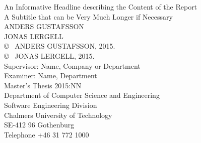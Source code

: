 \newpage
\thispagestyle{plain}
\vspace*{4.5cm}
An Informative Headline describing the Content of the Report\\
A Subtitle that can be Very Much Longer if Necessary\\
ANDERS GUSTAFSSON\\
JONAS LERGELL\\[0.5cm]

\copyright ~ ANDERS GUSTAFSSON, 2015.\\
\copyright ~ JONAS LERGELL, 2015.\\[0.5cm]

Supervisor: Name, Company or Department\\
Examiner: Name, Department\\[0.5cm]

Master's Thesis 2015:NN\\
Department of Computer Science and Engineering\\
Software Engineering Division\\
Chalmers University of Technology\\
SE-412 96 Gothenburg\\
Telephone +46 31 772 1000\\

\vfill

